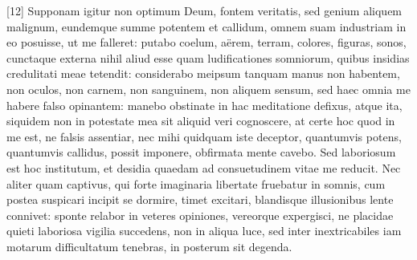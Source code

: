 [12] Supponam igitur non optimum Deum, fontem veritatis, sed genium aliquem malignum, eundemque summe potentem et callidum, omnem suam industriam in eo posuisse, ut me falleret: putabo coelum, aërem, terram, colores, figuras, sonos, cunctaque externa nihil aliud esse quam ludificationes somniorum, quibus insidias credulitati meae tetendit: considerabo meipsum tanquam manus non habentem, non oculos, non carnem, non sanguinem, non aliquem sensum, sed haec omnia me habere falso opinantem: manebo obstinate in hac meditatione defixus, atque ita, siquidem non in potestate mea sit aliquid veri cognoscere, at certe hoc quod in me est, ne falsis assentiar, nec mihi quidquam iste deceptor, quantumvis potens, quantumvis callidus, possit imponere, obfirmata mente cavebo. Sed laboriosum est hoc institutum, et desidia quaedam ad consuetudinem vitae me reducit. Nec aliter quam captivus, qui forte imaginaria libertate fruebatur in somnis, cum postea suspicari incipit se dormire, timet excitari, blandisque illusionibus lente connivet:  sponte relabor in veteres opiniones, vereorque expergisci, ne placidae quieti laboriosa vigilia succedens, non in aliqua luce, sed inter inextricabiles iam motarum difficultatum tenebras, in posterum sit degenda.
